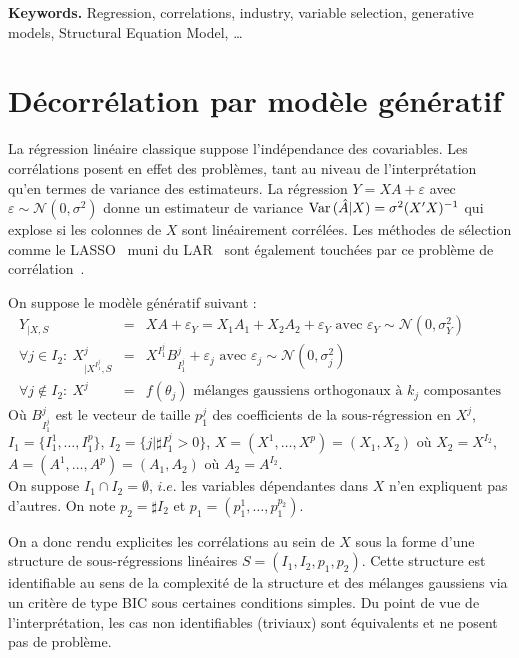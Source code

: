 \documentclass[12pt]{article}
\begin{document}
{\bf Keywords.} Regression, correlations, industry, variable selection, generative models, Structural Equation Model, \ldots


\section{Décorrélation par modèle génératif}
	La régression linéaire classique suppose l'indépendance des covariables. Les corrélations posent en effet des problèmes, tant au niveau de l'interprétation qu'en termes de variance des estimateurs. La régression $Y=XA+\varepsilon$ avec $ \varepsilon\sim \mathcal{N}(0,\sigma^2)$ donne un estimateur de variance $ {\rm Var}\,(\hat{A}|X)= \sigma^2(X'X)^{-1}$ qui explose si les colonnes de $X$ sont linéairement corrélées. Les méthodes de sélection comme le LASSO~\cite{tibshiranilasso} muni du LAR~\cite{efron2004least} sont également touchées par ce problème de corrélation~\cite{Zhao2006MSC}.
		
		On suppose le modèle génératif suivant :
	\begin{eqnarray}
	Y_{|X,S}&=&XA+\varepsilon_Y= X_1A_{1}+X_2A_{2}+\varepsilon_Y \textrm{ avec } \varepsilon_Y \sim \mathcal{N}(0,\sigma_Y^2) \label{MainR}\\
	\forall j \in I_2 : \  X^j_{|X^{I_1^j},S}&=&X^{I_1^j}B_{I_1^j}^j + \varepsilon_{j} \textrm{ avec } \varepsilon_j \sim \mathcal{N}(0,\sigma_j^2) \label{SR}\\
    \forall j \notin I_2 : \ X^j &=& f(\theta_j) \textrm{ mélanges gaussiens orthogonaux à $k_j$ composantes} 	
\end{eqnarray}
Où $B_{I_1^j}^j$ est le vecteur de taille $p_1^j$ des coefficients de la sous-régression en $X^j$,\\ $I_1=\{I_1^1,\dots,I_1^{p}\}$, $I_2=\{j |\sharp I_1^j>0 \}$, $X=(X^1,\dots,X^p)=(X_1,X_2)$ où $X_2=X^{I_2}$, $A=(A^1,\dots,A^p)=(A_1,A_2)$ où $A_2=A^{I_2}$.\\
On suppose $I_1\cap I_2=\emptyset$, $i.e.$ les variables dépendantes dans $X$ n'en expliquent pas d'autres.
On note $p_2= \sharp I_2$ et $p_1=(p_1^1,\dots,p_1^{p_2})$.
	
On a donc rendu explicites les corrélations au sein de $X$ sous la forme d'une structure de sous-régressions linéaires $S=(I_1,I_2,p_1,p_2)$.	
Cette structure est identifiable au sens de la complexité de la structure et des mélanges gaussiens via un critère de type BIC sous certaines conditions simples. Du point de vue de l'interprétation, les cas non identifiables (triviaux) sont équivalents et ne posent pas de problème.
\end{document}
